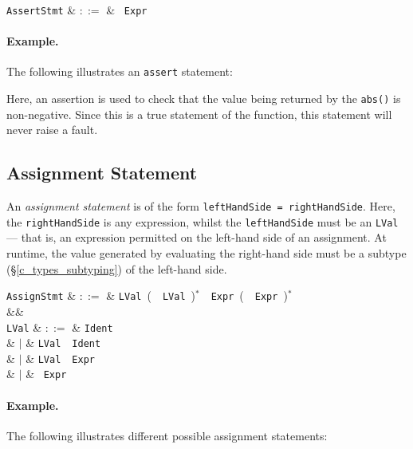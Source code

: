 \begin{syntax}
  \verb+AssertStmt+ & $::=$ & \ \verb+Expr+\\
\end{syntax}

\paragraph{Example.} The following illustrates an \lstinline{assert} statement:



Here, an assertion is used to check that the value being returned by the \lstinline{abs()} is non-negative.  Since this is a true statement of the function, this statement will never raise a fault.


\subsection{Assignment Statement}
\label{c_stmt_assign}

An {\em assignment statement} is of the form \lstinline{leftHandSide = rightHandSide}.  Here, the \lstinline{rightHandSide} is any expression, whilst the \lstinline{leftHandSide} must be an \lstinline{LVal} --- that is, an expression permitted on the left-hand side of an assignment.  At runtime, the value generated by evaluating the right-hand side must be a subtype (\S\ref{c_types_subtyping}) of the left-hand side.

\begin{syntax}
  \verb+AssignStmt+ & $::=$ & \verb+LVal+\ \big(\ \token{,}\ \verb+LVal+\ \big)$^*$\ \token{=}\ \verb+Expr+\ \big(\ \token{,}\ \verb+Expr+\ \big)$^*$\\
  &&\\
  \verb+LVal+ & $::=$ & \verb+Ident+\\
  & $|$ & \verb+LVal+\ \ \verb+Ident+\\
  & $|$ & \verb+LVal+\ \token{[}\ \verb+Expr+\ \token{]}\\
  & $|$ & \token{*}\ \verb+Expr+\\
\end{syntax}


\paragraph{Example.} The following illustrates different possible assignment statements:

